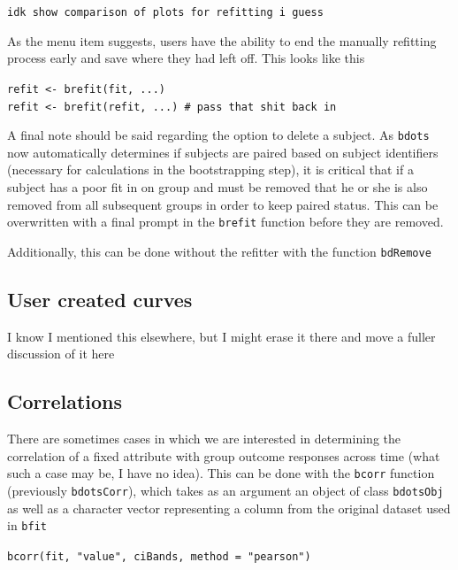 \documentclass{article}
\begin{document}
\begin{center}
\texttt{idk show comparison of plots for refitting i guess}
\end{center}

As the menu item suggests, users have the ability to end the manually refitting process early and save where they had left off. This looks like this

\begin{center}
\texttt{refit <- brefit(fit, ...)} \\
\texttt{refit <- brefit(refit, ...) \# pass that shit back in}
\end{center}

A final note should be said regarding the option to delete a subject. As \texttt{bdots} now automatically determines if subjects are paired based on subject identifiers (necessary for  calculations in the bootstrapping step), it is critical that if a subject has a poor fit in on group and must be removed that he or she is also removed from all subsequent groups in order to keep paired status. This can be overwritten with a final prompt in the \texttt{brefit} function before they are removed.

Additionally, this can be done without the refitter with the function \texttt{bdRemove}


\subsection{User created curves}

I know I mentioned this elsewhere, but I might erase it there and move a fuller discussion of it here

\subsection{Correlations}

There are sometimes cases in which we are interested in determining the correlation of a fixed attribute with group outcome responses across time (what such a case may be, I have no idea). This can be done with the \texttt{bcorr} function (previously \texttt{bdotsCorr}), which takes as an argument an object of class \texttt{bdotsObj} as well as a character vector representing a column from the original dataset used in \texttt{bfit}

\begin{center}
\texttt{bcorr(fit, "value", ciBands, method = "pearson")} 
\end{center}
\end{document}
